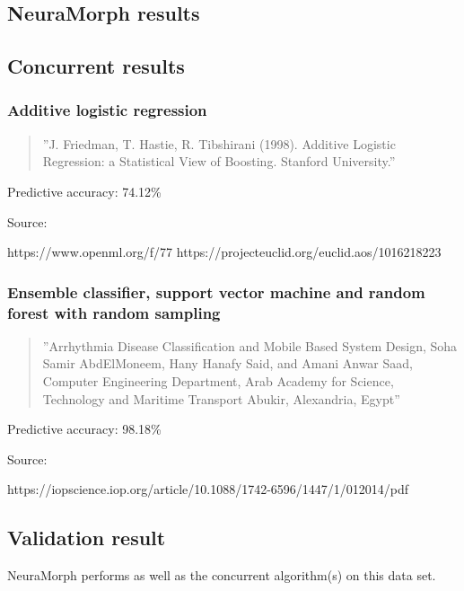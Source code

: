 \documentclass[8pt, a4paper]{article}
\begin{document}
\subsection{NeuraMorph results}

%

\subsection{Concurrent results}

\subsubsection{Additive logistic regression}

\begin{quote}
''J. Friedman, T. Hastie, R. Tibshirani (1998). Additive Logistic Regression: a Statistical View of Boosting. Stanford University.''
\end{quote}

Predictive accuracy: 74.12\%

Source:

https://www.openml.org/f/77
https://projecteuclid.org/euclid.aos/1016218223

\subsubsection{Ensemble classifier, support vector machine and random forest with random sampling}

\begin{quote}
''Arrhythmia Disease Classification and Mobile Based System
Design, Soha Samir AbdElMoneem, Hany Hanafy Said, and Amani Anwar Saad, Computer Engineering Department, Arab Academy for Science, Technology and
Maritime Transport Abukir, Alexandria, Egypt''
\end{quote}

Predictive accuracy: 98.18\%

Source:

https://iopscience.iop.org/article/10.1088/1742-6596/1447/1/012014/pdf

\subsection{Validation result}

NeuraMorph performs as well as the concurrent algorithm(s) on this data set.
\end{document}
